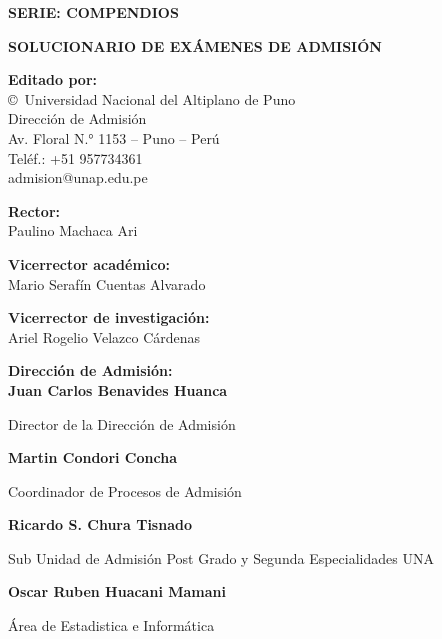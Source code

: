 \begin{flushleft}
	{\scriptsize
		\setlength{\parindent}{0pt}
		\setlength{\parskip}{2pt}
		
		\textbf{SERIE: COMPENDIOS }
		
		\vspace{0.25cm}
		
		\textbf{SOLUCIONARIO DE EXÁMENES DE ADMISIÓN}\\
	
		
		\vspace{0.25cm}
		
		\textbf{Editado por:}\\
		\copyright\ Universidad Nacional del Altiplano de Puno\\
		Dirección de Admisión\\
		Av. Floral N.° 1153 -- Puno -- Perú\\
		Teléf.: +51 957734361\\
		admision@unap.edu.pe
		
		\vspace{0.15cm}
		
		\textbf{Rector:}\\
		Paulino Machaca Ari
		
		\textbf{Vicerrector académico:}\\
		Mario Serafín Cuentas Alvarado
		
		\textbf{Vicerrector de investigación:}\\
		Ariel Rogelio Velazco Cárdenas
		
		\vspace{0.15cm}
		
		\textbf{Dirección de Admisión: }\\
	
	
		\textbf{Juan Carlos Benavides Huanca}
	
		Director de la Dirección de Admisión
	
		\textbf{Martin Condori Concha}	
		
		Coordinador de Procesos de Admisión
		
		\textbf{Ricardo S. Chura Tisnado}
		
		Sub Unidad de Admisión Post Grado y Segunda Especialidades UNA
		
		\textbf{Oscar Ruben Huacani Mamani}
		
		Área de Estadistica e Informática
		
		
		
		
		\vspace{0.15cm}
		
}
\end{flushleft}
